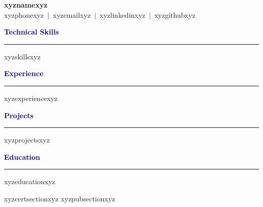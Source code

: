 \documentclass[10pt,letterpaper]{article}
\newcommand{\resumesection}[1]{%
  \vspace{6pt}%
  \textcolor{navy}{\textbf{#1}}%
  \vspace{-6pt}\\%
  \textcolor{navy}{\hrule}%
  \vspace{3pt}%
}
\begin{document}
{\centering
  {\large\bfseries xyznamexyz}\\[3pt]
  \small xyzphonexyz\ $|$\ xyzemailxyz\ $|$\ xyzlinkedinxyz\ $|$\ xyzgithubxyz\\
}

\vspace{4pt}

\resumesection{Technical Skills}
\begin{itemize}[leftmargin=1.5em,itemsep=1pt,topsep=2pt]
xyzskillsxyz
\end{itemize}

\resumesection{Experience}
xyzexperiencexyz

\resumesection{Projects}
xyzprojectsxyz

\resumesection{Education}
xyzeducationxyz

xyzcertsectionxyz
xyzpubsectionxyz
\end{document}
